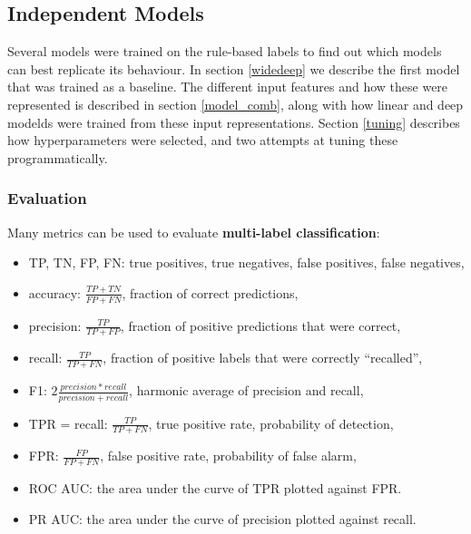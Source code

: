 \subsection{Independent Models}
\label{exp_models}

Several models were trained on the rule-based labels to find out which models can best replicate its behaviour.
In section \ref{widedeep} we describe the first model that was trained as a baseline.
The different input features and how these were represented is described in section \ref{model_comb}, along with how linear and deep modelds were trained from these input representations.
Section \ref{tuning} describes how hyperparameters were selected, and two attempts at tuning these programmatically.


\subsubsection{Evaluation}

Many metrics can be used to evaluate \textbf{multi-label classification}:

\begin{itemize}
  \item TP, TN, FP, FN: true positives, true negatives, false positives, false negatives,
  \item accuracy: $\frac{TP + TN}{FP + FN}$, fraction of correct predictions,
  \item precision: $\frac{TP}{TP + FP}$, fraction of positive predictions that were correct,
  \item recall: $\frac{TP}{TP + FN}$, fraction of positive labels that were correctly ``recalled'',
  \item F1: $2\frac{precision * recall}{precision + recall}$, harmonic average of precision and recall,
  \item TPR = recall: $\frac{TP}{TP+FN}$, true positive rate, probability of detection,
  \item FPR: $\frac{FP}{FP+FN}$, false positive rate, probability of false alarm,
  \item ROC AUC: the area under the curve of TPR plotted against FPR.
  \item PR AUC: the area under the curve of precision plotted against recall.
\end{itemize}

